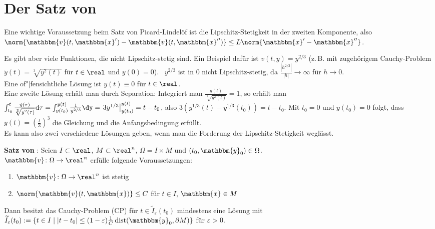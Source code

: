 \pagebreak

\section{%
    Der Satz von %
}

Eine wichtige Voraussetzung beim Satz von Picard-Lindelöf ist die
Lipschitz-Stetigkeit in der zweiten Komponente, also
$\norm{\mathbbm{v}(t, \mathbbm{x}') - \mathbbm{v}(t, \mathbbm{x}'')} \le
L\norm{\mathbbm{x}' - \mathbbm{x}''}$.

Es gibt aber viele Funktionen, die nicht Lipschitz-stetig sind.
Ein Beispiel dafür ist $v(t, y) = y^{2/3}$
(z.\,B. mit zugehörigem Cauchy-Problem
$\dot{y}(t) = \sqrt[3]{y^2(t)}$ für $t \in \real$ und $y(0) = 0$). \
$y^{2/3}$ ist in $0$ nicht Lipschitz-stetig, da
$\frac{|h^{2/3}|}{|h|} \to \infty$ für $h \to 0$. \\
Eine of"|fensichtliche Lösung ist $y(t) \equiv 0$ für $t \in \real$. \\
Eine zweite Lösung erhält man durch Separation:
Integriert man $\frac{\dot{y}(t)}{\sqrt[3]{y^2(t)}} = 1$, so erhält man
$\int_{t_0}^t \frac{\dot{y}(\tau)}{\sqrt[3]{y^2(\tau)}} \d\tau =
\int_{y(t_0)}^{y(t)} \frac{1}{y^{2/3}} \dy =
\left.3y^{1/3}\right|_{y(t_0)}^{y(t)} = t - t_0$,
also $3(y^{1/3}(t) - y^{1/3}(t_0)) = t - t_0$.
Mit $t_0 = 0$ und $y(t_0) = 0$ folgt, dass
$y(t) = \left(\frac{t}{3}\right)^3$ die Gleichung und die Anfangsbedingung
erfüllt. \\
Es kann also zwei verschiedene Lösungen geben, wenn man die Forderung der
Lipschitz-Stetig\-keit weglässt.

\linie

\textbf{Satz von }:
Seien $I \subset \real$, $M \subset \real^n$, $\Omega = I \times M$
und $(t_0, \mathbbm{y}_0) \in \Omega$. \\
$\mathbbm{v}\colon \Omega \rightarrow \real^n$ erfülle folgende
Voraussetzungen:
\begin{enumerate}
    \item
    $\mathbbm{v}\colon \Omega \rightarrow \real^n$ ist stetig

    \item
    $\norm{\mathbbm{v}(t, \mathbbm{x})} \le C$ für
    $t \in I$, $\mathbbm{x} \in M$
\end{enumerate}
Dann besitzt das Cauchy-Problem (CP) für $t \in \widetilde{I}_\varepsilon(t_0)$
mindestens eine Lösung mit \\
$\widetilde{I}_\varepsilon(t_0) := \{t \in I \;|\; |t - t_0| \le
(1 - \varepsilon) \frac{1}{C} \dist(\mathbbm{y}_0, \partial M)\}$
für $\varepsilon > 0$.

